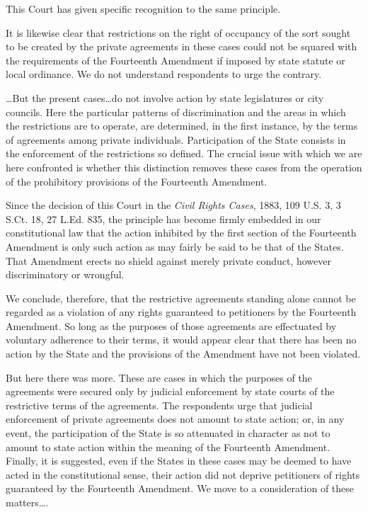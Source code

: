 This Court has given specific recognition to the same principle.

It is likewise clear that restrictions on the right of occupancy of the sort
sought to be created by the private agreements in these cases could not be
squared with the requirements of the Fourteenth Amendment if imposed by state
statute or local ordinance. We do not understand respondents to urge the
contrary.

\ldots But the present cases\ldots do not involve action by state legislatures
or city councils. Here the particular patterns of discrimination and the areas
in which the restrictions are to operate, are determined, in the first instance,
by the terms of agreements among private individuals. Participation of the State
consists in the enforcement of the restrictions so defined. The crucial issue
with which we are here confronted is whether this distinction removes these
cases from the operation of the prohibitory provisions of the Fourteenth
Amendment.

Since the decision of this Court in the \emph{Civil Rights Cases}, 1883, 109
U.S. 3, 3 S.Ct. 18, 27 L.Ed. 835, the principle has become firmly embedded in
our constitutional law that the action inhibited by the first section of the
Fourteenth Amendment is only such action as may fairly be said to be that of the
States. That Amendment erects no shield against merely private conduct, however
discriminatory or wrongful.

We conclude, therefore, that the restrictive agreements standing alone cannot be
regarded as a violation of any rights guaranteed to petitioners by the
Fourteenth Amendment. So long as the purposes of those agreements are
effectuated by voluntary adherence to their terms, it would appear clear that
there has been no action by the State and the provisions of the Amendment have
not been violated.

But here there was more. These are cases in which the purposes of the agreements
were secured only by judicial enforcement by state courts of the restrictive
terms of the agreements. The respondents urge that judicial enforcement of
private agreements does not amount to state action; or, in any event, the
participation of the State is so attenuated in character as not to amount to
state action within the meaning of the Fourteenth Amendment. Finally, it is
suggested, even if the States in these cases may be deemed to have acted in the
constitutional sense, their action did not deprive petitioners of rights
guaranteed by the Fourteenth Amendment. We move to a consideration of these
matters\ldots .


